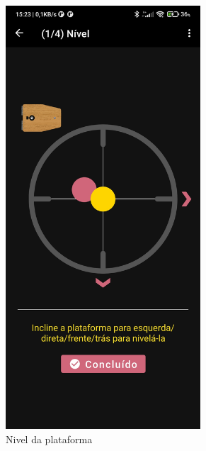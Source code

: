 \begin{figure}[!htb]
	\centering
	\caption{Telas de Alinhamento}
	\label{alinhamento}
	\begin{subfigure}[b]{0.3\textwidth}
		\centering
		\includegraphics[width=0.8\textwidth]{figuras/desAplicativo/nivel}
		\caption{Nivel da plataforma}
		\label{menu}
	\end{subfigure}
	\hfill
	\begin{subfigure}[b]{0.3\textwidth}
		\centering

\end{subfigure}
\end{figure}
